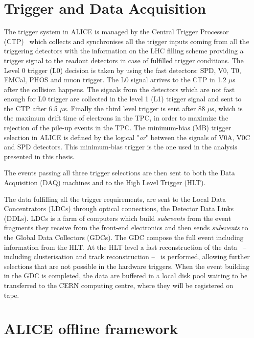 %
%
\section{Trigger and Data Acquisition} \label{sec:data_flow}

The trigger system in ALICE is managed by the Central Trigger Processor (CTP)~\cite{alice_trigger} 
which collects and synchronises all the trigger inputs coming from all the triggering detectors 
with the information on the LHC filling scheme providing a trigger signal to the readout detectors
in case of fulfilled trigger conditions. 
The Level 0 trigger (L0) decision is taken by using the fast detectors: SPD, V0, T0, EMCal, PHOS and 
muon trigger. The L0 signal arrives to the CTP in 1.2 $\mu$s after the collision happens. 
The signals from the detectors which are not fast enough for L0 trigger are collected in the level 1
(L1) trigger signal and sent to the CTP after 6.5 $\mu$s. 
Finally the third level trigger is sent after 88 $\mu$s, which is the maximum drift time of electrons
in the TPC, in order to maximize the rejection of the pile-up events in the TPC.
The minimum-bias (MB) trigger  selection in ALICE is defined by the logical "\textit{or}" between the
signals of V0A, V0C and SPD detectors. This minimum-bias trigger is the one used in the analysis
presented in this thesis.

The events passing all three trigger selections are then sent to both the Data Acquisition (DAQ) machines 
and to the High Level Trigger (HLT).


The data fulfilling all the trigger requirements, are sent to the Local Data Concentrators (LDCs)
through optical connections, the Detector Data Links (DDLs).
LDCs is a farm of computers which build \textit{subevents} from the event fragments they receive from
the front-end electronics and then sends \textit{subevents} to the Global Data Collectors (GDCs).
The GDC compose the full event including information from the HLT.
At the HLT level a fast reconstruction of the data \ -- including clusterisation and track
reconstruction -- \ is performed, allowing further selections that are not possible in the hardware
triggers.
When the event building in the GDC is completed, the data are buffered in a local disk pool waiting 
to be transferred to the CERN computing centre, where they will be registered on tape.

%
%
\section{ALICE offline framework} \label{sec:offline}

